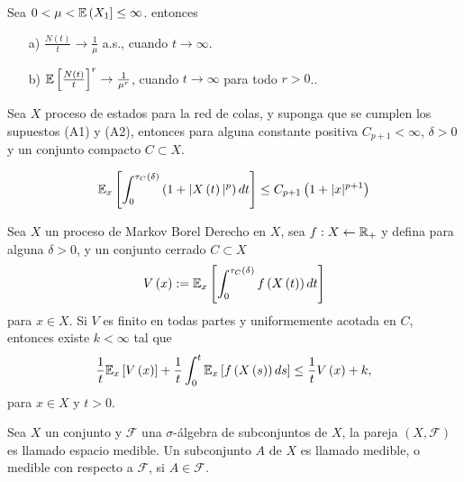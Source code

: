 \begin{Teo}\label{Tma.5.1.Gut} Sea
$0<\mu<\mathbb{E}\left(X_{1}\right]\leq\infty$. entonces

\begin{itemize}
\item[a)] $\frac{N\left(t\right)}{t}\rightarrow\frac{1}{\mu}$
a.s., cuando $t\rightarrow\infty$.


\item[b)]$\mathbb{E}\left[\frac{N\left(t\right)}{t}\right]^{r}\rightarrow\frac{1}{\mu^{r}}$,
cuando $t\rightarrow\infty$ para todo $r>0$..
\end{itemize}
\end{Teo}


\begin{Prop}
Sea $X$ proceso de estados para la red de colas, y suponga que se
cumplen los supuestos (A1) y (A2), entonces para alguna constante
positiva $C_{p+1}<\infty$, $\delta>0$ y un conjunto compacto
$C\subset X$.

\begin{equation}\label{Eq.5.4}
\mathbb{E}_{x}\left[\int_{0}^{\tau_{C}\left(\delta\right)}\left(1+|X\left(t\right)|^{p}\right)dt\right]\leq
C_{p+1}\left(1+|x|^{p+1}\right)
\end{equation}
\end{Prop}

\begin{Prop}
Sea $X$ un proceso de Markov Borel Derecho en $X$, sea
$f:X\leftarrow\mathbb{R}_{+}$ y defina para alguna $\delta>0$, y un
conjunto cerrado $C\subset X$
\[V\left(x\right):=\mathbb{E}_{x}\left[\int_{0}^{\tau_{C}\left(\delta\right)}f\left(X\left(t\right)\right)dt\right]\]
para $x\in X$. Si $V$ es finito en todas partes y uniformemente
acotada en $C$, entonces existe $k<\infty$ tal que
\begin{equation}\label{Eq.5.11}
\frac{1}{t}\mathbb{E}_{x}\left[V\left(x\right)\right]+\frac{1}{t}\int_{0}^{t}\mathbb{E}_{x}\left[f\left(X\left(s\right)\right)ds\right]\leq\frac{1}{t}V\left(x\right)+k,
\end{equation}
para $x\in X$ y $t>0$.
\end{Prop}




\begin{Def}
Sea $X$ un conjunto y $\mathcal{F}$ una $\sigma$-\'algebra de
subconjuntos de $X$, la pareja $\left(X,\mathcal{F}\right)$ es
llamado espacio medible. Un subconjunto $A$ de $X$ es llamado
medible, o medible con respecto a $\mathcal{F}$, si
$A\in\mathcal{F}$.
\end{Def}


